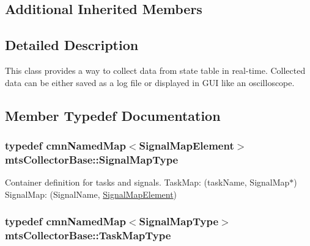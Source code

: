 \subsection*{Additional Inherited Members}


\subsection{Detailed Description}
This class provides a way to collect data from state table in real-\/time. Collected data can be either saved as a log file or displayed in G\-U\-I like an oscilloscope. 

\subsection{Member Typedef Documentation}
\hypertarget{classmts_collector_base_ad4d928af971d864065a9a6d9650a4050}{
\subsubsection[{Signal\-Map\-Type}]{\setlength{\rightskip}{0pt plus 5cm}typedef {\bf cmn\-Named\-Map}$<${\bf Signal\-Map\-Element}$>$ {\bf mts\-Collector\-Base\-::\-Signal\-Map\-Type}\hspace{0.3cm}{\ttfamily [protected]}}}\label{classmts_collector_base_ad4d928af971d864065a9a6d9650a4050}
Container definition for tasks and signals. Task\-Map\-: (task\-Name, Signal\-Map$\ast$) Signal\-Map\-: (Signal\-Name, \hyperlink{classmts_collector_base_1_1_signal_map_element}{Signal\-Map\-Element}) \hypertarget{classmts_collector_base_a6b47b3df8797f600ac9791640561f035}{
\subsubsection[{Task\-Map\-Type}]{\setlength{\rightskip}{0pt plus 5cm}typedef {\bf cmn\-Named\-Map}$<${\bf Signal\-Map\-Type}$>$ {\bf mts\-Collector\-Base\-::\-Task\-Map\-Type}\hspace{0.3cm}{\ttfamily [protected]}}}\label{classmts_collector_base_a6b47b3df8797f600ac9791640561f035}


